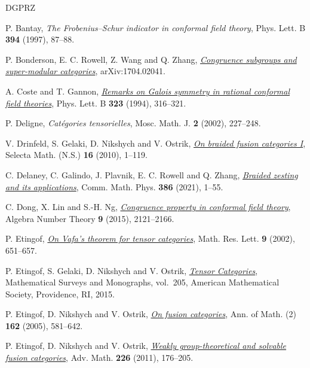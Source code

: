 \documentclass[11pt,oneside]{amsart}
\theoremstyle{remark}
\begin{document}
\begin{thebibliography}{DGPRZ}

P. Bantay,
\emph{The Frobenius--Schur indicator in conformal field theory},
Phys. Lett. B \textbf{394} (1997), 87--88.

P. Bonderson, E. C. Rowell, Z. Wang and Q. Zhang,
\href{https://arxiv.org/abs/1704.02041}{\emph{Congruence subgroups and super-modular categories}},
arXiv:1704.02041.

A. Coste and T. Gannon,
\href{https://doi.org/10.1016/0370-2693(94)91226-2}{\emph{Remarks on Galois symmetry in rational conformal field theories}},
Phys. Lett. B \textbf{323} (1994), 316--321.

P. Deligne,
\emph{Cat\'egories tensorielles},
Mosc. Math. J. \textbf{2} (2002), 227--248.

V. Drinfeld, S. Gelaki, D. Nikshych and V. Ostrik,
\href{https://arxiv.org/abs/0906.0620}{\emph{On braided fusion categories I}},
Selecta Math. (N.S.) \textbf{16} (2010), 1--119.

C. Delaney, C. Galindo, J. Plavnik, E. C. Rowell and Q. Zhang,
\href{https://arxiv.org/abs/2005.05544}{\emph{Braided zesting and its applications}},
Comm. Math. Phys. \textbf{386} (2021), 1--55.

C. Dong, X. Lin and S.-H. Ng,
\href{https://arxiv.org/abs/1201.6644}{\emph{Congruence property in conformal field theory}},
Algebra Number Theory \textbf{9} (2015), 2121--2166.

P. Etingof,
\href{https://arxiv.org/abs/math/0207007}{\emph{On Vafa's theorem for tensor categories}},
Math. Res. Lett. \textbf{9} (2002), 651--657.

P. Etingof, S. Gelaki, D. Nikshych and V. Ostrik,
\href{https://doi.org/10.1090/surv/205}{\emph{Tensor Categories}},
Mathematical Surveys and Monographs, vol.~205,
American Mathematical Society, Providence, RI, 2015.

P. Etingof, D. Nikshych and V. Ostrik,
\href{https://doi.org/10.4007/annals.2005.162.581}{\emph{On fusion categories}},
Ann. of Math. (2) \textbf{162} (2005), 581--642.

P. Etingof, D. Nikshych and V. Ostrik,
\href{https://arxiv.org/abs/0809.3031}{\emph{Weakly group-theoretical and solvable fusion categories}},
Adv. Math. \textbf{226} (2011), 176--205.


\end{thebibliography}
\end{document}
